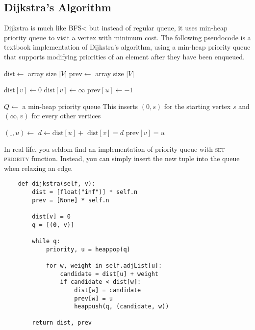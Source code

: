 \subsection{Dijkstra's Algorithm}

\noindent Dijkstra is much like BFS< but instead of regular queue, it uses min-heap priority queue to visit a vertex with minimum cost.
The following pseudocode is a textbook implementation of Dijkstra's algorithm, using a min-heap priority queue that supports modifying priorities of an element after they have been enqueued.

\noindent \hrulefill
\begin{algorithmic}[1]
   
    \State $\mathrm{dist} \gets$ array size $|V|$
    \State $\mathrm{prev} \gets$ array size $|V|$

        $\mathrm{dist}[v] \gets 0$
      \EndIf
        $\mathrm{dist}[v] \gets \infty$
      \EndIf
      \State $\mathrm{prev}[u] \gets -1$
    \EndFor
  \item[]
    \State $Q \gets$ a min-heap priority queue
      \LComment This inserts $(0, s)$ for the starting vertex $s$ and $(\infty, v)$ for every other vertices
      \State {}
    \EndFor
  \item[]
    \State $(\textrm{\_}, u) \gets$ 
      \State $d \gets \textrm{dist}[u] +$ 
        \State $\textrm{dist}[v] = d$
        \State $\textrm{prev}[v] = u$
        \State {}
      \EndIf
    \EndFor
    \EndWhile
  \EndFunction
\end{algorithmic}
\noindent \hrulefill

\noindent In real life, you seldom find an implementation of priority queue with \textsc{set-priority} function.
Instead, you can simply insert the new tuple into the queue when relaxing an edge.

\begin{verbatim}
    def dijkstra(self, v):
        dist = [float("inf")] * self.n
        prev = [None] * self.n

        dist[v] = 0
        q = [(0, v)]

        while q:
            priority, u = heappop(q)

            for w, weight in self.adjList[u]:
                candidate = dist[u] + weight
                if candidate < dist[w]:
                    dist[w] = candidate
                    prev[w] = u
                    heappush(q, (candidate, w))

        return dist, prev
\end{verbatim}

